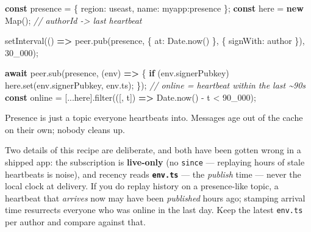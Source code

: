 \documentclass[
  nobib]{tufte-handout}
\newenvironment{Shaded}{}{}
\newcommand{\AttributeTok}[1]{\textcolor[rgb]{0.49,0.56,0.16}{#1}}
\newcommand{\BuiltInTok}[1]{\textcolor[rgb]{0.00,0.50,0.00}{#1}}
\newcommand{\CommentTok}[1]{\textcolor[rgb]{0.38,0.63,0.69}{\textit{#1}}}
\newcommand{\ControlFlowTok}[1]{\textcolor[rgb]{0.00,0.44,0.13}{\textbf{#1}}}
\newcommand{\DataTypeTok}[1]{\textcolor[rgb]{0.56,0.13,0.00}{#1}}
\newcommand{\DecValTok}[1]{\textcolor[rgb]{0.25,0.63,0.44}{#1}}
\newcommand{\FunctionTok}[1]{\textcolor[rgb]{0.02,0.16,0.49}{#1}}
\newcommand{\KeywordTok}[1]{\textcolor[rgb]{0.00,0.44,0.13}{\textbf{#1}}}
\newcommand{\NormalTok}[1]{#1}
\newcommand{\OperatorTok}[1]{\textcolor[rgb]{0.40,0.40,0.40}{#1}}
\newcommand{\PreprocessorTok}[1]{\textcolor[rgb]{0.74,0.48,0.00}{#1}}
\newcommand{\StringTok}[1]{\textcolor[rgb]{0.25,0.44,0.63}{#1}}
\begin{document}
\begin{Shaded}
\begin{Highlighting}[]
\KeywordTok{const}\NormalTok{ presence }\OperatorTok{=}\NormalTok{ \{ }\DataTypeTok{region}\OperatorTok{:} \StringTok{\textquotesingle{}useast\textquotesingle{}}\OperatorTok{,} \DataTypeTok{name}\OperatorTok{:} \StringTok{\textquotesingle{}myapp:presence\textquotesingle{}}\NormalTok{ \}}\OperatorTok{;}
\KeywordTok{const}\NormalTok{ here }\OperatorTok{=} \KeywordTok{new} \BuiltInTok{Map}\NormalTok{()}\OperatorTok{;}   \CommentTok{// authorId {-}\textgreater{} last heartbeat}

\PreprocessorTok{setInterval}\NormalTok{(() }\KeywordTok{=\textgreater{}}\NormalTok{ peer}\OperatorTok{.}\FunctionTok{pub}\NormalTok{(presence}\OperatorTok{,}\NormalTok{ \{ }\DataTypeTok{at}\OperatorTok{:} \BuiltInTok{Date}\OperatorTok{.}\FunctionTok{now}\NormalTok{() \}}\OperatorTok{,}\NormalTok{ \{ }\DataTypeTok{signWith}\OperatorTok{:}\NormalTok{ author \})}\OperatorTok{,} \DecValTok{30\_000}\NormalTok{)}\OperatorTok{;}

\ControlFlowTok{await}\NormalTok{ peer}\OperatorTok{.}\FunctionTok{sub}\NormalTok{(presence}\OperatorTok{,}\NormalTok{ (env) }\KeywordTok{=\textgreater{}}\NormalTok{ \{}
  \ControlFlowTok{if}\NormalTok{ (env}\OperatorTok{.}\AttributeTok{signerPubkey}\NormalTok{) here}\OperatorTok{.}\FunctionTok{set}\NormalTok{(env}\OperatorTok{.}\AttributeTok{signerPubkey}\OperatorTok{,}\NormalTok{ env}\OperatorTok{.}\AttributeTok{ts}\NormalTok{)}\OperatorTok{;}
\NormalTok{\})}\OperatorTok{;}
\CommentTok{// online = heartbeat within the last \textasciitilde{}90s}
\KeywordTok{const}\NormalTok{ online }\OperatorTok{=}\NormalTok{ [}\OperatorTok{...}\NormalTok{here]}\OperatorTok{.}\FunctionTok{filter}\NormalTok{(([}\OperatorTok{,}\NormalTok{ t]) }\KeywordTok{=\textgreater{}} \BuiltInTok{Date}\OperatorTok{.}\FunctionTok{now}\NormalTok{() }\OperatorTok{{-}}\NormalTok{ t }\OperatorTok{\textless{}} \DecValTok{90\_000}\NormalTok{)}\OperatorTok{;}
\end{Highlighting}
\end{Shaded}

Presence is just a topic everyone heartbeats into. Messages age out of
the cache on their own; nobody cleans up.

Two details of this recipe are deliberate, and both have been gotten
wrong in a shipped app: the subscription is \textbf{live-only} (no
\texttt{since} --- replaying hours of stale heartbeats is noise), and
recency reads \textbf{\texttt{env.ts}} --- the \emph{publish} time ---
never the local clock at delivery. If you do replay history on a
presence-like topic, a heartbeat that \emph{arrives} now may have been
\emph{published} hours ago; stamping arrival time resurrects everyone
who was online in the last day. Keep the latest \texttt{env.ts} per
author and compare against that.
\end{document}
